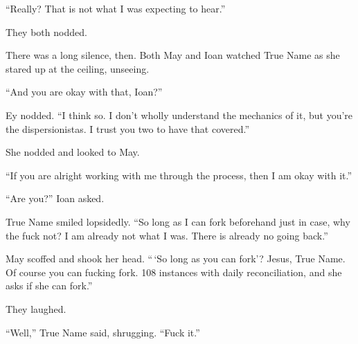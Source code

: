 ``Really? That is not what I was expecting to hear.''

They both nodded.

There was a long silence, then. Both May and Ioan watched True Name as she stared up at the ceiling, unseeing.

``And you are okay with that, Ioan?''

Ey nodded. ``I think so. I don't wholly understand the mechanics of it, but you're the dispersionistas. I trust you two to have that covered.''

She nodded and looked to May.

``If you are alright working with me through the process, then I am okay with it.''

``Are you?'' Ioan asked.

True Name smiled lopsidedly. ``So long as I can fork beforehand just in case, why the fuck not? I am already not what I was. There is already no going back.''

May scoffed and shook her head. ``\,`So long as you can fork'? Jesus, True Name. Of course you can fucking fork. 108 instances with daily reconciliation, and she asks if she can fork.''

They laughed.

``Well,'' True Name said, shrugging. ``Fuck it.''

